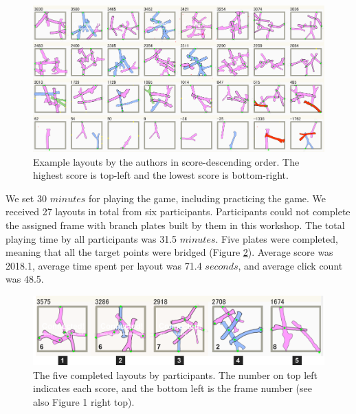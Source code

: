 \begin{figure}[ht]
	\begin{center}
		\includegraphics[width = 0.4\paperwidth]{images/fabrication/designs_score.png}
		\caption{Example layouts by the authors in score-descending order. The highest score is top-left and the lowest score is bottom-right.}
		\label{fig:testlayouts}
	\end{center}
\end{figure}



We set 30 $minutes$ for playing the game, including practicing the game.
We received 27 layouts in total from six participants.
Participants could not complete the assigned frame with branch plates built by them in this workshop.
The total playing time by all participants was 31.5 $minutes$.
Five plates were completed, meaning that all the target points were bridged (Figure \ref{fig:layouts}).
Average score was 2018.1, average time spent per layout was 71.4 $seconds$, and average click count was 48.5.

\begin{figure}[ht]
	\begin{center}
		\includegraphics[width = 0.4\paperwidth]{images/fabrication/casestudy.pdf}
		\caption{The five completed layouts by participants. The number on top left indicates each score, and the bottom left is the frame number (see also Figure 1 right top).   }
		\label{fig:layouts}
	\end{center}
\end{figure}


